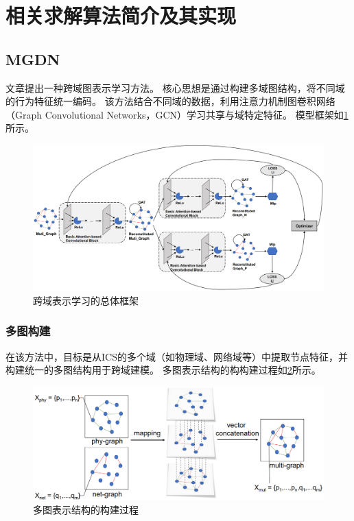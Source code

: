 \section{相关求解算法简介及其实现}

\subsection{MGDN}

文章提出一种跨域图表示学习方法。
核心思想是通过构建多域图结构，将不同域的行为特征统一编码。
该方法结合不同域的数据，利用注意力机制图卷积网络（Graph Convolutional Networks，GCN）\cite{kipf2017semi}学习共享与域特定特征。
模型框架如\cref{figure:跨域表示学习的总体框架}所示。

\begin{figure}[ht]
    \centering
    \includegraphics[width=1\textwidth]{img/跨域表示学习的总体框架.png}
    \caption{跨域表示学习的总体框架}
    \label{figure:跨域表示学习的总体框架}
\end{figure}

\subsubsection{多图构建}

在该方法中，目标是从ICS的多个域（如物理域、网络域等）中提取节点特征，并构建统一的多图结构用于跨域建模。
多图表示结构的构构建过程如\cref{figure:多图表示结构的构建过程}所示。

\begin{figure}[ht]
    \centering
    \includegraphics[width=1\textwidth]{img/多图表示结构的构建过程.png}
    \caption{多图表示结构的构建过程}
    \label{figure:多图表示结构的构建过程}
\end{figure}

